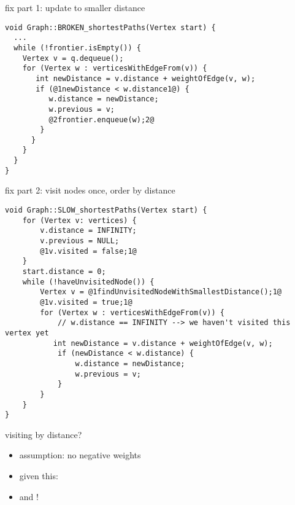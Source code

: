 \begin{frame}[fragile,label=fixPartOne]{fix part 1: update to smaller distance}
\begin{lstlisting}
void Graph::BROKEN_shortestPaths(Vertex start) {
  ... 
  while (!frontier.isEmpty()) {
    Vertex v = q.dequeue();
    for (Vertex w : verticesWithEdgeFrom(v)) {
       int newDistance = v.distance + weightOfEdge(v, w);
       if (@1newDistance < w.distance1@) {
          w.distance = newDistance;
          w.previous = v;
          @2frontier.enqueue(w);2@
        } 
      }
    }
  }
}
\end{lstlisting}
\end{frame}

\begin{frame}[fragile,label=withDistance]{fix part 2: visit nodes once, order by distance}
\begin{lstlisting}
void Graph::SLOW_shortestPaths(Vertex start) {
    for (Vertex v: vertices) {
        v.distance = INFINITY;
        v.previous = NULL;
        @1v.visited = false;1@
    }
    start.distance = 0;
    while (!haveUnvisitedNode()) {
        Vertex v = @1findUnvisitedNodeWithSmallestDistance();1@
        @1v.visited = true;1@
        for (Vertex w : verticesWithEdgeFrom(v)) {
            // w.distance == INFINITY --> we haven't visited this vertex yet
           int newDistance = v.distance + weightOfEdge(v, w);
            if (newDistance < w.distance) {
                w.distance = newDistance;
                w.previous = v;
            } 
        }
    }
}
\end{lstlisting}
\end{frame}

\begin{frame}{visiting by distance?}
\begin{itemize}
\item assumption: no negative weights
\item given this: 
\item and !
\end{itemize}
\end{frame}

